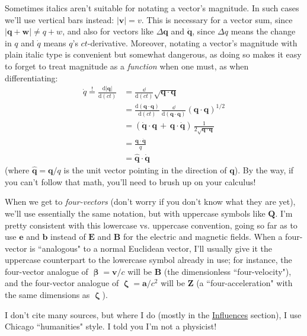\documentclass[12pt]{article}
\renewcommand{\vv}[1]{\mathbf{#1}}
\newcommand{\dd}[1]{\mathrm{d}#1}
\newcommand{\vvbeta}{\bm{\upbeta}}
\newcommand{\vvzeta}{\bm{\upzeta}}
\begin{document}
Sometimes italics aren't suitable for notating a vector's magnitude. In such cases we'll use vertical bars instead: $\vert \vv v \vert = v$. This is necessary for a vector sum, since $\vert \vv q + \vv w \vert \neq q + w$, and also for vectors like $\Delta \vv q$ and $\dot{\vv q}$, since $\Delta q$ means the change in $q$ and $\dot{q}$ means $q$'s $ct$-derivative. Moreover, notating a vector's magnitude with plain italic type is convenient but somewhat dangerous, as doing so makes it easy to forget to treat magnitude as a \emph{function} when one must, as when differentiating:
\begin{equation*}
\begin{aligned}
\dot{q} \overset{!}{=} \frac{\dd \vert \vv q \vert}{\dd (ct)} &= \frac{\dd}{\dd (ct)} \sqrt{ \vv q \cdot \vv q } \\[4pt]
&=  \frac{\dd (\vv q \cdot \vv q)}{\dd (ct)} \, \frac{\dd}{\dd (\vv q \cdot \vv q)} \left( \vv q \cdot \vv q \right) ^{1/2} \\[2pt]
&=\left( \dot{\vv q} \cdot \vv q  \, + \, \vv q \cdot \dot{\vv q} \right) \, \frac{1}{2 \sqrt{\vv q \cdot \vv q}} \\
&= \frac{\vv q \cdot \dot{\vv q}}{q} \\[3pt]
&= \vv{ \hat q } \cdot \dot{ \vv q }
\end{aligned}
\end{equation*}
(where $\vv{ \hat q } = \vv q / q$ is the unit vector pointing in the direction of $\vv q$). By the way, if you can't follow that math, you'll need to brush up on your calculus!

When we get to \emph{four-vectors} (don't worry if you don't know what they are yet), we'll use essentially the same notation, but with uppercase symbols like $\vv Q$. I'm pretty consistent with this lowercase vs. uppercase convention, going so far as to use $\vv e$ and $\vv b$ instead of $\vv E$ and $\vv B$ for the electric and magnetic fields. When a four-vector is ``analogous" to a normal Euclidean vector, I'll usually give it the uppercase counterpart to the lowercase symbol already in use; for instance, the four-vector analogue of $\vvbeta = \vv v / c$ will be $\vv B$ (the dimensionless ``four-velocity"), and the four-vector analogue of $\vvzeta = \vv a / c^2$ will be $\vv Z$ (a ``four-acceleration" with the same dimensions as $\vvzeta$).

I don't cite many sources, but where I do (mostly in the \hyperref[sec:r]{Influences} section), I use Chicago ``humanities" style. I told you I'm not a physicist!
\end{document}
